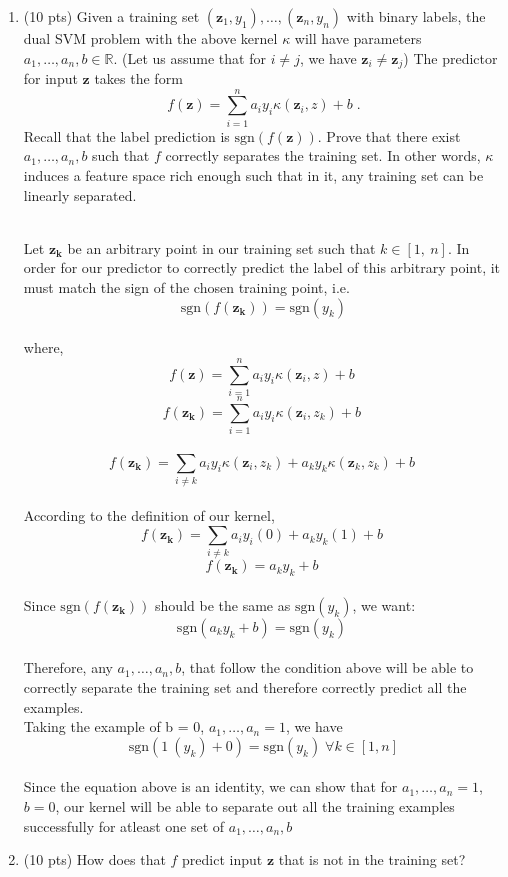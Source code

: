 \documentclass[a4paper]{article}
\theoremstyle{definition}
\def\R{\mathbb R}
\newenvironment{soln}{
    \leavevmode\color{blue}\ignorespaces
}{}
\begin{document}
\begin{enumerate}
\begin{soln}
\end{soln}
\item (10 pts) Given a training set $(\mathbf z_1, y_1), \ldots,(\mathbf z_n, y_n)$ with binary labels, the dual SVM problem with the above
kernel $\kappa$ will have parameters $a_1, \ldots, a_n,b \in \R$. (Let us assume that for $i \neq j$, we have
$\mathbf z_i \neq \mathbf z_j$) The predictor
for input $\mathbf z$ takes the form
\[
f(\mathbf z)=\sum_{i=1}^na_iy_i\kappa(\mathbf z_i,z) +b\;.
\]
Recall that the label prediction is $\mathrm{sgn}(f(\mathbf z))$. Prove that there exist $a_1, \ldots, a_n, b$ such that $f$ correctly separates
the training set. In other words, $\kappa$ induces a feature space rich enough such that in it, any training set can be linearly separated.
\begin{soln}
    \\Let $\mathbf{z_k}$ be an arbitrary point in our training set such that $k \in [1,\: n]$. In order for our predictor to correctly predict the label of this arbitrary point, it must match the sign of the chosen training point, i.e.
    \[ \mathrm{sgn}(f(\mathbf {z_k})) = \mathrm{sgn}(y_k)\]
    \\ where, 
    \[ f(\mathbf z)=\sum_{i=1}^na_iy_i\kappa(\mathbf z_i,z) +b\; \]
    \[ f(\mathbf {z_k})=\sum_{i=1}^na_iy_i\kappa(\mathbf z_i,z_k) +b\; \]\
    \[ f(\mathbf {z_k})=\sum_{i \neq k}a_iy_i\kappa(\mathbf z_i,z_k) + a_ky_k\kappa(\mathbf z_k,z_k) +b\; \]
    \\According to the definition of our kernel,
    \[ f(\mathbf {z_k})=\sum_{i \neq k}a_iy_i(0 )+ a_ky_k(1) +b\; \]
    \[ f(\mathbf {z_k})= a_ky_k +b\; \]
    \\ Since $\mathrm{sgn}(f(\mathbf {z_k}))$ should be the same as $\mathrm{sgn}(y_k)$, we want:
    \[ \mathrm{sgn}(a_ky_k +b) = \mathrm{sgn}(y_k)\; \]
    \\ Therefore, any $a_1, \ldots, a_n, b$, that follow the condition above will be able to correctly separate the training set and therefore correctly predict all the examples.
    \\ Taking the example of b = 0, $a_1, \ldots, a_n = 1$, we have 
    \[ \mathrm{sgn}(1 \: (y_k) +0) = \mathrm{sgn}(y_k)\; \forall k \in [1, n]\]
    \\Since the equation above is an identity, we can show that for $a_1, \ldots, a_n = 1$, $b = 0$, our kernel will be able to separate out all the training examples successfully for atleast one set of
    $a_1, \ldots, a_n, b$
\end{soln}
\item (10 pts) How does that $f$ predict input $\mathbf z$ that is not in the training set?

\end{enumerate}
\end{document}
